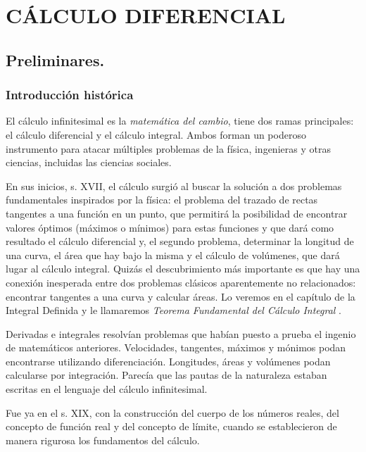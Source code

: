 \part{CÁLCULO DIFERENCIAL}
\chapter{Preliminares.}	\label{preliminares}

	\section{Introducción histórica}
	
		El cálculo infinitesimal es la \emph{matemática del cambio}, tiene dos ramas principales: el cálculo diferencial y el cálculo integral. Ambos forman un poderoso instrumento para atacar múltiples problemas de la física, ingenieras y otras ciencias, incluidas las ciencias sociales.
	
		En sus inicios, s. XVII, el cálculo surgió al buscar la solución a dos problemas fundamentales inspirados por la física: el problema del trazado de rectas tangentes a una función en un punto, que permitirá la posibilidad de encontrar valores óptimos (máximos o mínimos) para estas funciones y que dará como resultado el cálculo diferencial y, el segundo problema, determinar la longitud de una curva, el área que hay bajo la misma y el cálculo de volúmenes, que dará lugar al cálculo integral. Quizás el descubrimiento más importante es que hay una conexión inesperada entre dos problemas clásicos aparentemente no relacionados: encontrar tangentes a una curva y calcular áreas. Lo veremos en el capítulo de la Integral Definida y le llamaremos \textit{Teorema Fundamental del Cálculo Integral }.
	
		Derivadas e integrales resolvían problemas que habían puesto a prueba el ingenio de matemáticos anteriores. Velocidades, tangentes, máximos y mónimos podan encontrarse utilizando diferenciación. Longitudes, áreas y volúmenes podan calcularse por integración. Parecía que las pautas de la naturaleza estaban escritas en el lenguaje del cálculo infinitesimal. 
	
		Fue ya en el s. XIX, con la construcción del cuerpo de los números reales, del concepto de función real y del concepto de límite, cuando se establecieron de manera rigurosa los fundamentos del cálculo. 

	
